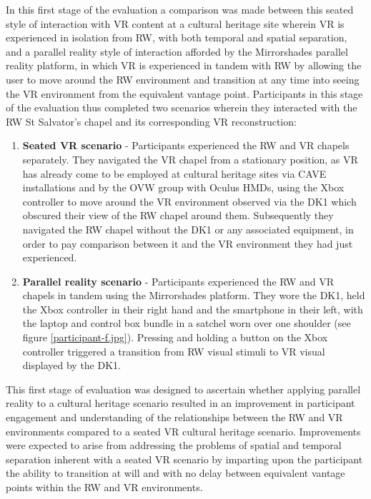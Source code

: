 In this first stage of the evaluation a comparison was made between this seated style of interaction with VR content at a cultural heritage site wherein VR is experienced in isolation from RW, with both temporal and spatial separation, and a parallel reality style of interaction afforded by the Mirrorshades parallel reality platform, in which VR is experienced in tandem with RW by allowing the user to move around the RW environment and transition at any time into seeing the VR environment from the equivalent vantage point. Participants in this stage of the evaluation thus completed two scenarios wherein they interacted with the RW St Salvator's chapel and its corresponding VR reconstruction:

\begin{enumerate}
	\item \textbf{Seated VR scenario} - Participants experienced the RW and VR chapels separately. They navigated the VR chapel from a stationary position, as VR has already come to be employed at cultural heritage sites via CAVE installations and by the OVW group with Oculus HMDs, using the Xbox controller to move around the VR environment observed via the DK1 which obscured their view of the RW chapel around them. Subsequently they navigated the RW chapel without the DK1 or any associated equipment, in order to pay comparison between it and the VR environment they had just experienced.
	\item \textbf{Parallel reality scenario} - Participants experienced the RW and VR chapels in tandem using the Mirrorshades platform. They wore the DK1, held the Xbox controller in their right hand and the smartphone in their left, with the laptop and control box bundle in a satchel worn over one shoulder (see figure \ref{participant-f.jpg}). Pressing and holding a button on the Xbox controller triggered a transition from RW visual stimuli to VR visual displayed by the DK1.
\end{enumerate}

This first stage of evaluation was designed to ascertain whether applying parallel reality to a cultural heritage scenario resulted in an improvement in participant engagement and understanding of the relationships between the RW and VR environments compared to a seated VR cultural heritage scenario. Improvements were expected to arise from addressing the problems of spatial and temporal separation inherent with a seated VR scenario by imparting upon the participant the ability to transition at will and with no delay between equivalent vantage points within the RW and VR environments.

